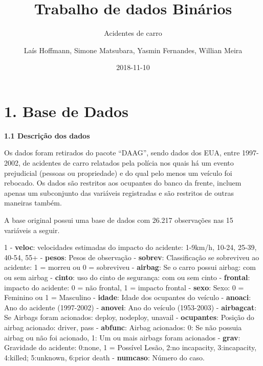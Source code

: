 \documentclass[]{article}
\title{Trabalho de dados Binários}
\subtitle{Acidentes de carro}
\author{Laís Hoffmann, Simone Matsubara, Yasmin Fernandes, Willian Meira}
\date{2018-11-10}
\begin{document}
\maketitle

\section{1. Base de Dados}\label{base-de-dados}

\textbf{1.1 Descrição dos dados}

Os dados foram retirados do pacote ``DAAG'', sendo dados dos EUA, entre
1997-2002, de acidentes de carro relatados pela polícia nos quais há um
evento prejudicial (pessoas ou propriedade) e do qual pelo menos um
veículo foi rebocado. Os dados são restritos aos ocupantes do banco da
frente, incluem apenas um subconjunto das variáveis registradas e são
restritos de outras maneiras também.

A base original possui uma base de dados com 26.217 observações nas 15
variáveis a seguir.

1 - \textbf{veloc}: velocidades estimadas do impacto do acidente:
1-9km/h, 10-24, 25-39, 40-54, 55+  - \textbf{pesos}: Pesos de
observação  - \textbf{sobrev}: Classificação se sobreviveu ao
acidente: 1 = morreu ou 0 = sobreviveu  - \textbf{airbag}: Se
o carro possui airbag: com ou sem airbag  - \textbf{cinto}:
uso do cinto de segurança: com ou sem cinto  -
\textbf{frontal}: impacto do acidente: 0 = não frontal, 1 = impacto
frontal  - \textbf{sexo}: Sexo: 0 = Feminino ou 1 = Masculino
 - \textbf{idade}: Idade dos ocupantes do veículo  -
\textbf{anoaci}: Ano do acidente (1997-2002)  -
\textbf{anovei}: Ano do veículo (1953-2003)  -
\textbf{airbagcat}: Se Airbags foram acionados: deploy, nodeploy,
unavail  - \textbf{ocupantes}: Posição do airbag acionado:
driver, pass  - \textbf{abfunc}: Airbag acionados: 0: Se não
possuia airbag ou não foi acionado, 1: Um ou mais airbags foram
acionados  - \textbf{grav}: Gravidade do acidente: 0:none, 1
= Possível Lesão, 2:no incapacity, 3:incapacity, 4:killed; 5:unknown,
6:prior death  - \textbf{numcaso}: Número do caso.
\end{document}
